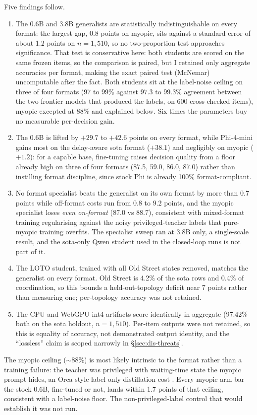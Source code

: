 Five findings follow.

\begin{enumerate}
\item {} The 0.6B and 3.8B generalists are
statistically indistinguishable on every format: the largest gap, 0.8
points on myopic, sits against a standard error of about 1.2 points on
$n{=}1{,}510$, so no two-proportion test approaches significance. That
test is conservative here: both students are scored on the same
frozen items, so the comparison is paired, but I retained only aggregate
accuracies per format, making the exact paired test (McNemar)
uncomputable after the fact. Both students sit at the label-noise ceiling
on three of four formats (97 to 99\% against 97.3 to 99.3\% agreement
between the two frontier models that produced the labels, on 600
cross-checked items), myopic excepted at 88\% and explained below. Six
times the parameters buy no measurable per-decision gain.
\item {} The 0.6B is
lifted by $+29.7$ to $+42.6$ points on every format, while Phi-4-mini
gains most on the delay-aware
sota format ($+38.1$) and negligibly on myopic ($+1.2$): for a capable
base, fine-tuning raises decision quality from a floor already high on
three of four formats (87.5, 59.0, 86.0, 87.0) rather than instilling
format discipline, since
stock Phi is already 100\% format-compliant.
\item {} No format specialist beats the generalist
on its own format by more than $0.7$ points while off-format costs run
from $0.8$ to $9.2$ points, and the myopic specialist loses \emph{even
on-format} (87.0 vs 88.7), consistent with mixed-format training
regularising against the noisy privileged-teacher labels that pure-myopic
training overfits. The specialist sweep ran at 3.8B only, a
single-scale result, and the sota-only
Qwen student used in the closed-loop runs is not part of it.
\item {} The LOTO student,
trained with all Old Street states removed, matches the generalist on
every format. Old Street is 4.2\% of the sota rows and 0.4\% of
coordination, so this bounds a held-out-topology deficit near 7 points
rather than measuring one; per-topology accuracy was not retained.
\item {} The
CPU and WebGPU int4 artifacts score identically in aggregate (97.42\% both
on the sota holdout, $n{=}1{,}510$). Per-item outputs were not retained,
so this is equality of accuracy, not demonstrated output identity, and the
``lossless'' claim is scoped narrowly in \S\ref{sec:dis-threats}.
\end{enumerate}
The myopic ceiling ($\sim$88\%) is most likely intrinsic to the format
rather than a training failure: the teacher was privileged with
waiting-time state the myopic prompt hides, an Orca-style label-only
distillation cost \cite{mukherjee2023orca}. Every myopic arm bar the stock
0.6B, fine-tuned or not, lands within 1.7 points of that ceiling,
consistent with a label-noise floor. The non-privileged-label control that
would establish it was not run.

